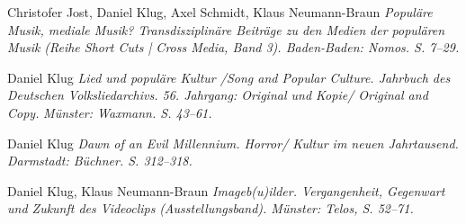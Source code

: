 \documentclass[9pt]{article}
\begin{document}
\vspace{-0.03in}
\newline{}
\newline{}\vspace{-0.03in}
\newline{} 
\newline\noindent Christofer Jost, Daniel Klug, Axel Schmidt, Klaus Neumann-Braun
\newline\noindent\emph{Popul\"{a}re Musik, mediale Musik? Transdisziplin\"{a}re Beitr\"{a}ge zu den Medien}\vspace{-0.03in}
\newline\noindent\emph{der popul\"{a}ren Musik}
\newline\noindent\emph{(Reihe Short Cuts | Cross Media, Band 3). Baden-Baden: Nomos. S. 7--29.}
\bigskip


\newline{} 
\newline\noindent Daniel Klug
\newline\noindent\emph{Lied und populäre Kultur /Song and Popular Culture. Jahrbuch des}\vspace{-0.03in}
\newline\noindent\emph{Deutschen Volksliedarchivs. 56. Jahrgang: Original und Kopie/ Original and Copy.}
\newline\noindent\emph{Münster: Waxmann. S. 43--61.}
\bigskip


\newline{} 
\newline\noindent Daniel Klug
\newline\noindent\emph{Dawn of an Evil Millennium. Horror/ Kultur im neuen Jahrtausend.}
\newline\noindent\emph{Darmstadt: Büchner. S. 312–318.}
\bigskip

\newline{} 
\newline\noindent Daniel Klug, Klaus Neumann-Braun
\newline\noindent\emph{Imageb(u)ilder. Vergangenheit, Gegenwart und Zukunft des Videoclips}
\newline\noindent\emph{(Ausstellungsband). Münster: Telos, S. 52--71.}
\bigskip
\end{document}
